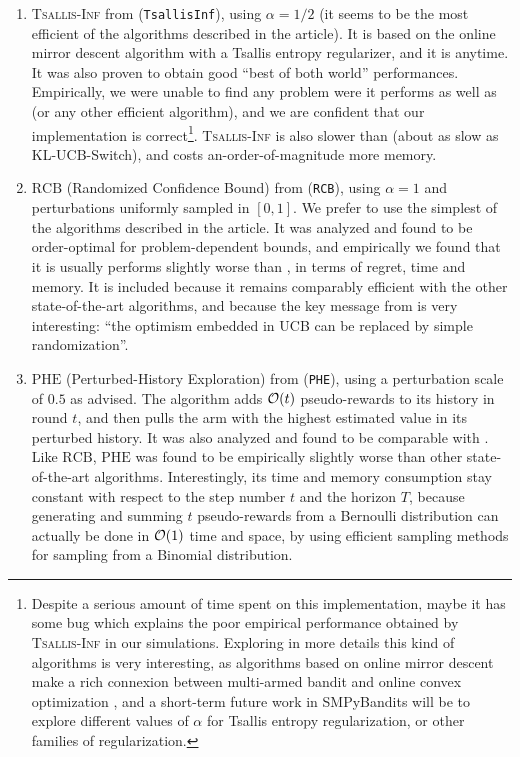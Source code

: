 \begin{enumerate}
    \item
    \textsc{Tsallis-Inf} from \cite{Zimmert2018} (\texttt{TsallisInf}), using $\alpha=1/2$ (it seems to be the most efficient of the algorithms described in the article).
    It is based on the online mirror descent algorithm with a Tsallis entropy regularizer, and it is anytime.
    It was also proven to obtain good ``best of both world'' performances.
    Empirically, we were unable to find any problem were it performs as well as \UCB{} (or any other efficient algorithm), and we are confident that our implementation is correct\footnote{Despite a serious amount of time spent on this implementation, maybe it has some bug which explains the poor empirical performance obtained by \textsc{Tsallis-Inf} in our simulations. Exploring in more details this kind of algorithms is very interesting, as algorithms based on online mirror descent make a rich connexion between multi-armed bandit and online convex optimization \cite{Hazan2016introduction}, and a short-term future work in SMPyBandits will be to explore different values of $\alpha$ for Tsallis entropy regularization, or other families of regularization.}.
    \textsc{Tsallis-Inf} is also slower than \UCB{} (about as slow as KL-UCB-Switch), and costs an-order-of-magnitude more memory.

    \item
    $\mathrm{RCB}$ (Randomized Confidence Bound) from \cite{KimTewari2019} (\texttt{RCB}), using $\alpha=1$ and perturbations uniformly sampled in $[0,1]$. We prefer to use the simplest of the algorithms described in the article.
    It was analyzed and found to be order-optimal for problem-dependent bounds, and empirically we found that it is usually performs slightly worse than \UCB, in terms of regret, time and memory.
    It is included because it remains comparably efficient with the other state-of-the-art algorithms, and because the key message from \cite{KimTewari2019} is very interesting:
    ``the optimism embedded in UCB can be replaced by simple randomization''.

    \item
    $\mathrm{PHE}$ (Perturbed-History Exploration) from \cite{KvetonSzepesvari2019} (\texttt{PHE}), using a perturbation scale of $0.5$ as advised.
    The algorithm adds $\mathcal{O}(t)$ \iid{} pseudo-rewards to its history in round $t$, and then pulls the arm with the highest estimated value in its perturbed history.
    It was also analyzed and found to be comparable with \UCB.
    Like $\mathrm{RCB}$, $\mathrm{PHE}$ was found to be empirically slightly worse than other state-of-the-art algorithms.
    Interestingly, its time and memory consumption stay constant with respect to the step number $t$ and the horizon $T$, because generating and summing $t$ pseudo-rewards from a Bernoulli distribution can actually be done in $\mathcal{O}(1)$ time and space, by using efficient sampling methods for sampling from a Binomial distribution.
\end{enumerate}


